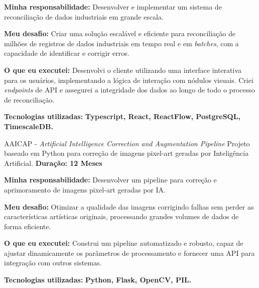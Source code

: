         \resumeItemListStart  
            \item \textbf{Minha responsabilidade:} Desenvolver e implementar um sistema de reconciliação de dados industriais em grande escala.  
            \item \textbf{Meu desafio:} Criar uma solução escalável e eficiente para reconciliação de milhões de registros de dados industriais em tempo real e em \textit{batches}, com a capacidade de identificar e corrigir erros.  
            \item \textbf{O que eu executei:} Desenvolvi o cliente utilizando uma interface interativa para os usuários, implementando a lógica de interação com nódulos visuais. Criei \textit{endpoints} de API e assegurei a integridade dos dados ao longo de todo o processo de reconciliação.  
            \item \textbf{Tecnologias utilizadas:} \textbf{Typescript, React, ReactFlow, PostgreSQL, TimescaleDB.}  
        \resumeItemListEnd  
        
    \vspace{-2mm}
    
    \resumeProject
      { AAICAP - \textit{Artificial Intelligence Correction and Augmentation Pipeline}}
      {Projeto baseado em Python para correção de imagens pixel-art geradas por Inteligência Artificial.}
      {\textbf{Duração: 12 Meses}}

        \resumeItemListStart
            \item \textbf{Minha responsabilidade:} Desenvolver um pipeline para correção e aprimoramento de imagens pixel-art geradas por IA.
            \item \textbf{Meu desafio:} Otimizar a qualidade das imagens corrigindo falhas sem perder as características artísticas originais, processando grandes volumes de dados de forma eficiente.
            \item \textbf{O que eu executei:} Construi um pipeline automatizado e robusto, capaz de ajustar dinamicamente os parâmetros de processamento e fornecer uma API para integração com outros sistemas.
            \item \textbf{Tecnologias utilizadas:} \textbf{Python, Flask, OpenCV, PIL.}
        \resumeItemListEnd
\resumeSubHeadingListEnd
\vspace{-8.5mm}

